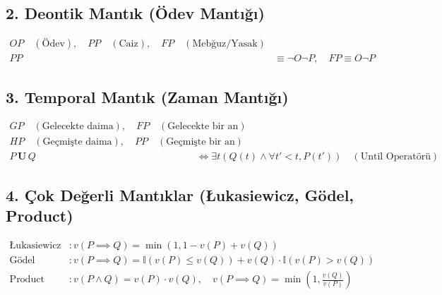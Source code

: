 \documentclass[11pt, a4paper]{article}
\begin{document}
\subsection{2. Deontik Mantık (Ödev Mantığı)}

\begin{align}
O P \quad (\text{Ödev}), \quad P P \quad (\text{Caiz}), \quad F P \quad (\text{Mebğuz/Yasak}) \\
P P &\equiv \neg O \neg P, \quad F P \equiv O \neg P
\end{align}

\subsection{3. Temporal Mantık (Zaman Mantığı)}

\begin{align}
G P \quad (\text{Gelecekte daima}), \quad F P \quad (\text{Gelecekte bir an}) \\
H P \quad (\text{Geçmişte daima}), \quad P P \quad (\text{Geçmişte bir an}) \\
P \, \mathbf{U} \, Q &\iff \exists t (Q(t) \land \forall t' < t, P(t')) \quad (\text{Until Operatörü})
\end{align}

\subsection{4. Çok Değerli Mantıklar (Łukasiewicz, Gödel, Product)}

\begin{align}
\text{Łukasiewicz} &: v(P \implies Q) = \min(1, 1 - v(P) + v(Q)) \\
\text{Gödel} &: v(P \implies Q) = \mathbb{I}(v(P) \le v(Q)) + v(Q) \cdot \mathbb{I}(v(P) > v(Q)) \\
\text{Product} &: v(P \land Q) = v(P) \cdot v(Q), \quad v(P \implies Q) = \min\left(1, \frac{v(Q)}{v(P)}\right)
\end{align}
\end{document}
